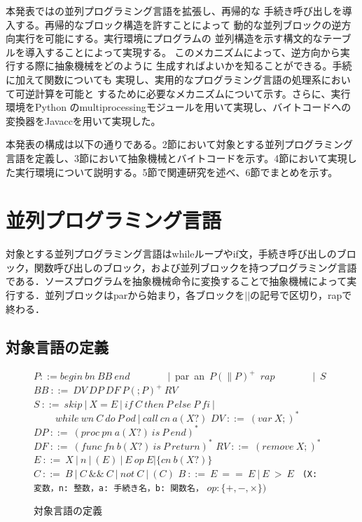 \documentclass[submit,PRO]{ipsj}
\def\|{\verb|}
\begin{document}
本発表では\cite{DBLP:conf/rc/IkedaY20}の並列プログラミング言語を拡張し、再帰的な
手続き呼び出しを導入する。再帰的なブロック構造を許すことによって
動的な並列ブロックの逆方向実行を可能にする。実行環境にプログラムの
並列構造を示す構文的なテーブルを導入することによって実現する。
このメカニズムによって、逆方向から実行する際に抽象機械をどのように
生成すればよいかを知ることができる。手続に加えて関数についても
実現し、実用的なプログラミング言語の処理系において可逆計算を可能と
するために必要なメカニズムについて示す。さらに、実行環境をPython
のmultiprocessingモジュールを用いて実現し、バイトコードへの
変換器をJavaccを用いて実現した。

本発表の構成は以下の通りである。2節において対象とする並列プログラミング
言語を定義し、3節において抽象機械とバイトコードを示す。4節において実現し
た実行環境について説明する。5節で関連研究を述べ、6節でまとめを示す。

%3
\section{並列プログラミング言語}

対象とする並列プログラミング言語はwhileループやif文，手続き呼び出しのブロック，関数呼び出しのブロック，および並列ブロックを持つプログラミング言語である．ソースプログラムを抽象機械命令に変換することで抽象機械によって実行する．並列ブロックはparから始まり，各ブロックを$||$の記号で区切り，rapで終わる．

\subsection{対象言語の定義}
\label{sec:3.1}

\begin{figure}[tb]
\vbox{
\hbox{$P ::= begin\ bn\ BB\ end$}
\hbox{\ \ \ \ \ \ \ $|$ par an $P(\parallel P)^+$ $rap$}
\hbox{\ \ \ \ \ \ \ $|$ $S$}
\hbox{$BB\ ::=\ DV\ DP\ DF\ P(;P)^+\ RV$}
\hbox{$S\ ::=\ skip\ |\  X = E\ |\ if\ C\ then\ P\ else\ P\ fi\ |$}
\hbox{$\ \ \ \ \ \ \ \ \ \  while\ wn\ C\ do\ P\ od\ |\ call\ cn\ a(X?)$}
\hbox{$DV\ ::=\ (var\ X;)^*$}
\hbox{$DP\ ::=\ (proc\ pn\ a(X?)\ is\ P\ end)^*$}
\hbox{$DF\ ::=\ (func\ fn\ b(X?)\ is\ P\ return)^*$}
\hbox{$RV\ ::=\ (remove\ X;)^*$}
\hbox{$E\ ::=\ X\ |\ n\ |\ (E)\ |\ E\ op\ E | \{cn\ b(X?)\}$}
\hbox{$C\ ::=\ B\ |\ C\ \&\& \ C\ |\ not\ C\ |\ (C)$}
\hbox{$B\ ::=\ E\ ==\ E\ |\ E\ >\ E$}
\hbox{\\}
\hbox{\| (X: 変数，n: 整数，a: 手続き名，b: 関数名，|}
\hbox{$op: \{+,-,\times \})$}
}
\centerline{}
\caption{対象言語の定義}
\label{fig:def}
\end{figure}
\end{document}
